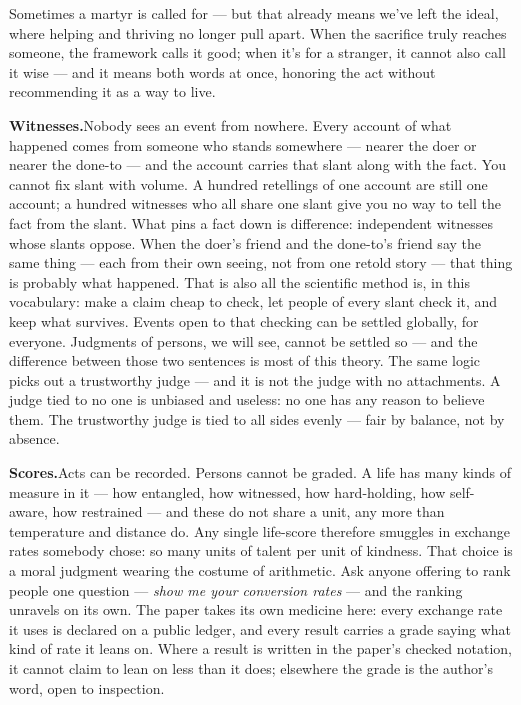 \documentclass[../main_explainer]{subfiles}
\begin{document}
Sometimes a martyr is called for --- but that already means we've left the ideal, where
helping and thriving no longer pull apart. When the sacrifice truly reaches someone, the
framework calls it good; when it's for a stranger, it cannot also call it wise --- and
it means both words at once, honoring the act without recommending it as a way to live.

\textbf{Witnesses.}\enspace Nobody sees an event from nowhere. Every account of what
happened comes from someone who stands somewhere --- nearer the doer or nearer the
done-to --- and the account carries that slant along with the fact. You cannot fix slant
with volume. A hundred retellings of one account are still one account; a hundred
witnesses who all share one slant give you no way to tell the fact from the slant. What
pins a fact down is difference: independent witnesses whose slants oppose. When the
doer's friend and the done-to's friend say the same thing --- each from their own
seeing, not from one retold story --- that thing is probably what happened. That is
also all the scientific method is, in this vocabulary: make a claim
cheap to check, let people of every slant check it, and keep what survives. Events open
to that checking can be settled globally, for everyone. Judgments of persons, we will
see, cannot be settled so --- and the difference between those two sentences is most of
this theory. The
same logic picks out a trustworthy judge --- and it is not the judge with no
attachments. A judge tied to no one is unbiased and useless: no one has any reason to
believe them. The trustworthy judge is tied to all sides evenly --- fair by balance, not
by absence.

\textbf{Scores.}\enspace Acts can be recorded. Persons cannot be graded. A life has many
kinds of measure in it --- how entangled, how witnessed, how hard-holding, how
self-aware, how restrained --- and these do not share a unit, any more than temperature
and distance do. Any single life-score therefore smuggles in exchange rates somebody
chose: so many units of talent per unit of kindness. That choice is a moral judgment
wearing the costume of arithmetic. Ask anyone offering to rank people one question ---
\emph{show me your conversion rates} --- and the ranking unravels on its own. The paper
takes its own medicine here: every exchange rate it uses is declared on a public
ledger, and every result carries a grade saying what kind of rate it leans on. Where a
result is written in the paper's checked notation, it cannot claim to lean on less than
it does; elsewhere the grade is the author's word, open to inspection.
\end{document}
